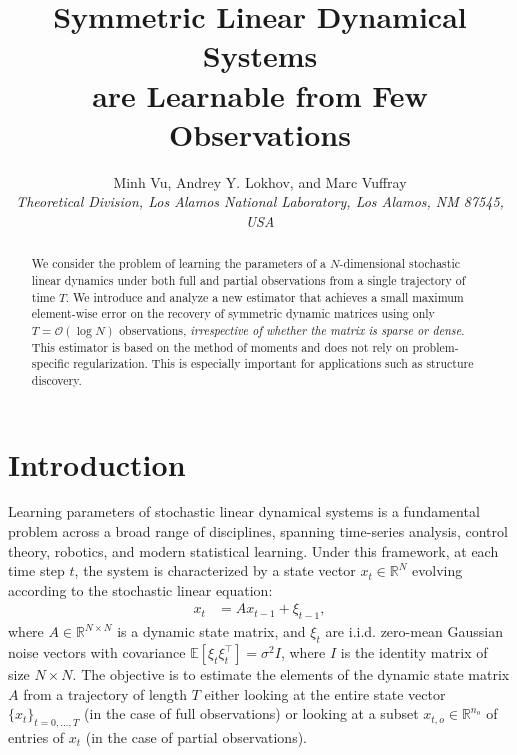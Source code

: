 \documentclass[11pt]{article}
\title{Symmetric Linear Dynamical Systems\\ are Learnable from Few Observations}
\author{Minh Vu, Andrey Y. Lokhov, and Marc Vuffray \\
\smaller \textit{Theoretical Division, Los Alamos National Laboratory, Los Alamos, NM 87545, USA}}
\date{}
\begin{document}
\maketitle

\begin{abstract}
We consider the problem of learning the parameters of a $N$-dimensional stochastic linear dynamics under both full and partial observations from a single trajectory of time $T$. We introduce and analyze a new estimator that achieves a small maximum element-wise error on the recovery of symmetric dynamic matrices using only $T=\mathcal{O}(\log N)$ observations, \textit{irrespective of whether the matrix is sparse or dense}. This estimator is based on the method of moments and does not rely on  problem-specific regularization. This is especially important for applications such as structure discovery.
\end{abstract}



\section{Introduction}
Learning parameters of stochastic linear dynamical systems \cite{aastrom1971system} is a fundamental problem across a broad range of disciplines, spanning time-series analysis, control theory, robotics, and modern statistical learning. Under this framework, at each time step $t$, the system is characterized by a state vector $x_t \in \mathbb{R}^N$ evolving according to the stochastic linear equation:
\begin{align}
    x_{t} &= Ax_{t-1} + \xi_{t-1},
    \label{eq:dynamics_formulation}
\end{align}
where $A \in \mathbb{R}^{N \times N}$ is a dynamic state matrix, and $\xi_t$ are i.i.d. zero-mean Gaussian noise vectors with covariance $\mathbb{E}[\xi_t\xi_t^\top] = \sigma^2  I$, where $I$ is the identity matrix of size $N \times N$. The objective is to estimate the elements of the dynamic state matrix $A$ from a trajectory of length $T$ either looking at the entire state vector $\{x_{t}\}_{t=0,\ldots,T}$ (in the case of full observations) or looking at a subset $x_{t,o} \in \mathbb{R}^{n_o}$ of entries of $x_{t}$ (in the case of partial observations).
\end{document}
